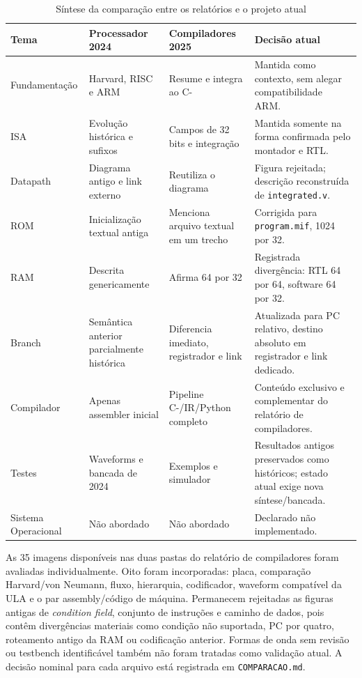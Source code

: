 \documentclass[
  12pt,
  oneside,
  a4paper,
  english,
  french,
  spanish,
  brazilian,
]{abntex2}
\begin{document}
\begin{table}[H]
\centering
\ABNTEXfontereduzida
\caption{Síntese da comparação entre os relatórios e o projeto atual}
\label{tab:comparacao}
\begin{tabular}{|p{}|p{}|p{}|p{}|}
\hline
\textbf{Tema} & \textbf{Processador 2024} & \textbf{Compiladores 2025} & \textbf{Decisão atual} \\
\hline
Fundamentação & Harvard, RISC e ARM & Resume e integra ao C- & Mantida como contexto, sem alegar compatibilidade ARM. \\
\hline
ISA & Evolução histórica e sufixos & Campos de 32 bits e integração & Mantida somente na forma confirmada pelo montador e RTL. \\
\hline
Datapath & Diagrama antigo e link externo & Reutiliza o diagrama & Figura rejeitada; descrição reconstruída de \texttt{integrated.v}. \\
\hline
ROM & Inicialização textual antiga & Menciona arquivo textual em um trecho & Corrigida para \texttt{program.mif}, 1024 por 32. \\
\hline
RAM & Descrita genericamente & Afirma 64 por 32 & Registrada divergência: RTL 64 por 64, software 64 por 32. \\
\hline
Branch & Semântica anterior parcialmente histórica & Diferencia imediato, registrador e link & Atualizada para PC relativo, destino absoluto em registrador e link dedicado. \\
\hline
Compilador & Apenas assembler inicial & Pipeline C-/IR/Python completo & Conteúdo exclusivo e complementar do relatório de compiladores. \\
\hline
Testes & Waveforms e bancada de 2024 & Exemplos e simulador & Resultados antigos preservados como históricos; estado atual exige nova síntese/bancada. \\
\hline
Sistema Operacional & Não abordado & Não abordado & Declarado não implementado. \\
\hline
\end{tabular}
\end{table}

As 35 imagens disponíveis nas duas pastas do relatório de compiladores foram avaliadas individualmente. Oito foram incorporadas: placa, comparação Harvard/von Neumann, fluxo, hierarquia, codificador, waveform compatível da ULA e o par assembly/código de máquina. Permanecem rejeitadas as figuras antigas de \emph{condition field}, conjunto de instruções e caminho de dados, pois contêm divergências materiais como condição não suportada, PC por quatro, roteamento antigo da RAM ou codificação anterior. Formas de onda sem revisão ou testbench identificável também não foram tratadas como validação atual. A decisão nominal para cada arquivo está registrada em \texttt{COMPARACAO.md}.
\end{document}
